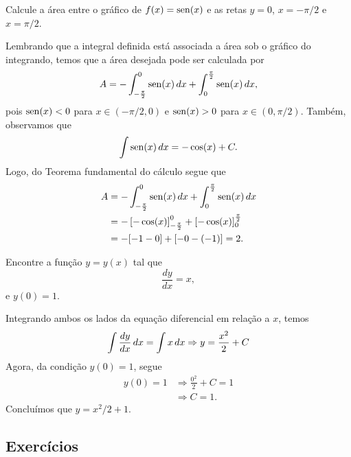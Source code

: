 \begin{exeresol}
  Calcule a área entre o gráfico de $f(x) = \operatorname{sen}(x)$ e as retas $y=0$, $x=-\pi/2$ e $x=\pi/2$.
\end{exeresol}
\begin{resol}
  Lembrando que a integral definida está associada a área sob o gráfico do integrando, temos que a área desejada pode ser calculada por
  \begin{equation}
    A = - \int_{-\frac{\pi}{2}}^0 \operatorname{sen}(x)\,dx + \int_0^{\frac{\pi}{2}} \operatorname{sen}(x)\,dx,
  \end{equation}
  pois $\operatorname{sen}(x) < 0$ para $x\in (-\pi/2, 0)$ e $\operatorname{sen}(x) > 0$ para $x\in (0, \pi/2)$.
  Também, observamos que
  \begin{equation}
    \int \operatorname{sen}(x)\,dx = -\cos(x) + C.
  \end{equation}
  Logo, do Teorema fundamental do cálculo segue que
  \begin{align}
    A &= - \int_{-\frac{\pi}{2}}^0 \operatorname{sen}(x)\,dx + \int_0^{\frac{\pi}{2}} \operatorname{sen}(x)\,dx \\
      &= -\left[-\cos(x)\right]_{-\frac{\pi}{2}}^0 + \left[-\cos(x)\right]_0^{\frac{\pi}{2}} \\
      &= -[-1 - 0] + [-0 - (-1)] = 2. 
  \end{align}
\end{resol}

\begin{exeresol}
  Encontre a função $y = y(x)$ tal que
  \begin{equation}
    \frac{dy}{dx} = x,
  \end{equation}
  e $y(0) = 1$.
\end{exeresol}
\begin{resol}
  Integrando ambos os lados da equação diferencial em relação a $x$, temos
  \begin{equation}
    \int \frac{dy}{dx}\,dx = \int x\,dx \Rightarrow y = \frac{x^2}{2} + C \\
  \end{equation}
  Agora, da condição $y(0) = 1$, segue
  \begin{align}
    y(0) = 1 &\Rightarrow \frac{0^2}{2} + C = 1 \\
             &\Rightarrow C = 1.
  \end{align}
  Concluímos que $y = x^2/2 + 1$.
\end{resol}

\subsection*{Exercícios}

